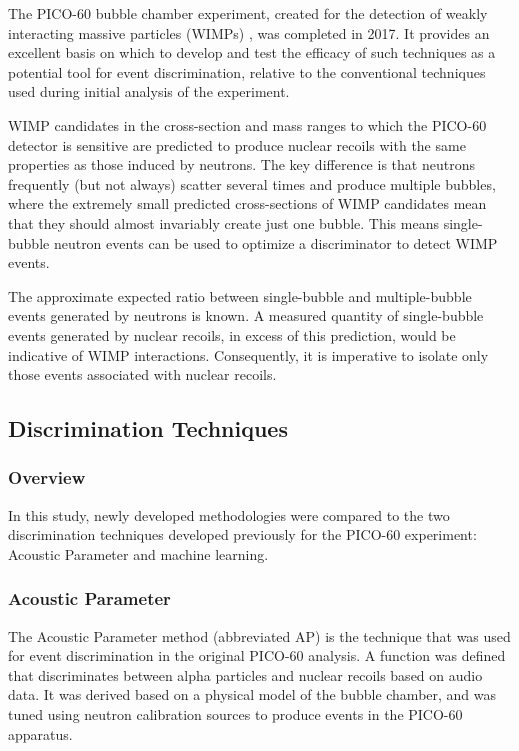 \documentclass[10pt]{article}
\begin{document}
The PICO-60 bubble chamber experiment, created for the detection of weakly interacting massive particles (WIMPs) \cite{pico}, was completed in 2017. It provides an excellent basis on which to develop and test the efficacy of such techniques as a potential tool for event discrimination, relative to the conventional techniques used during initial analysis of the experiment.

WIMP candidates in the cross-section and mass ranges to which the PICO-60 detector is sensitive are predicted to produce nuclear recoils with the same properties as those induced by neutrons. The key difference is that neutrons frequently (but not always) scatter several times and produce multiple bubbles, where the extremely small predicted cross-sections of WIMP candidates mean that they should almost invariably create just one bubble. This means single-bubble neutron events can be used to optimize a discriminator to detect WIMP events.

The approximate expected ratio between single-bubble and multiple-bubble events generated by neutrons is known. A measured quantity of single-bubble events generated by nuclear recoils, in excess of this prediction, would be indicative of WIMP interactions. Consequently, it is imperative to isolate only those events associated with nuclear recoils.

\subsection{Discrimination Techniques}

\subsubsection{Overview}

In this study, newly developed methodologies were compared to the two discrimination techniques developed previously for the PICO-60 experiment: Acoustic Parameter and machine learning.

\subsubsection{Acoustic Parameter}

The Acoustic Parameter method (abbreviated AP) is the technique that was used for event discrimination in the original PICO-60 analysis. A function was defined that discriminates between alpha particles and nuclear recoils based on audio data. It was derived based on a physical model of the bubble chamber, and was tuned using neutron calibration sources to produce events in the PICO-60 apparatus.
\end{document}
